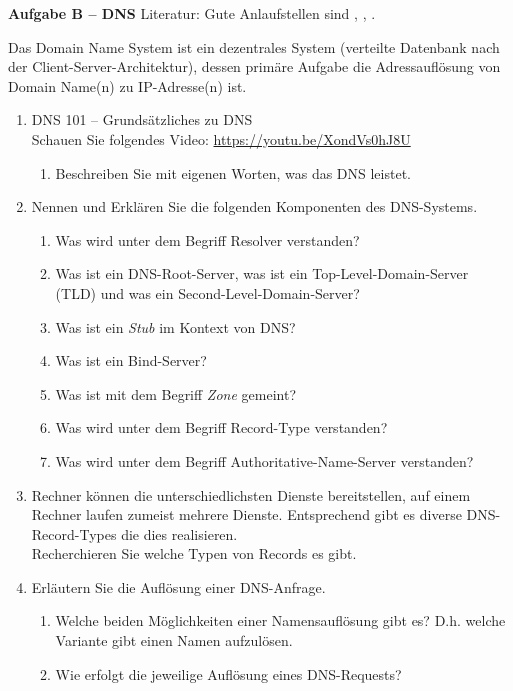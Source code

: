 \documentclass[paper=a4,fontsize=11pt]{scrartcl}%
\numberwithin{equation}{section}
\begin{document}
\begin{center}
\Large{\textbf{Aufgabe B -- DNS}}
Literatur:  Gute Anlaufstellen sind \cite[Kap. 2.5, S. 130ff]{Kurose2012}, \cite[Kap. 11, S. 511ff]{fall2011tcp}, \cite[Kap. 50, S. 825ff]{kozierok2005tcp}.
\end{center}
Das Domain Name System ist ein dezentrales System (verteilte Datenbank nach der Client-Server-Architektur), dessen primäre Aufgabe die Adressauflösung von Domain Name(n) zu IP-Adresse(n) ist.
\begin{enumerate}
	\item DNS 101 -- Grundsätzliches zu DNS\\
	Schauen Sie folgendes Video: \url{https://youtu.be/XondVs0hJ8U}
	\begin{enumerate}
		\item Beschreiben Sie mit eigenen Worten, was das DNS leistet.
	\end{enumerate}
	\item Nennen und Erklären Sie die folgenden Komponenten des DNS-Systems.
	\begin{enumerate}
		\item Was wird unter dem Begriff Resolver verstanden?
		\item Was ist ein DNS-Root-Server, was ist ein Top-Level-Domain-Server (TLD) und was ein Second-Level-Domain-Server?
		\item Was ist ein \emph{Stub} im Kontext von DNS?
		\item Was ist ein Bind-Server?
		\item Was ist mit dem Begriff \emph{Zone} gemeint?
		\item Was wird unter dem Begriff Record-Type verstanden?
		\item Was wird unter dem Begriff Authoritative-Name-Server verstanden?
	\end{enumerate}
	\item Rechner können die unterschiedlichsten Dienste bereitstellen, auf einem Rechner laufen zumeist mehrere Dienste. Entsprechend gibt es diverse DNS-Record-Types die dies realisieren.\\
	Recherchieren Sie welche Typen von Records es gibt.
	\item Erläutern Sie die Auflösung einer DNS-Anfrage.
	\begin{enumerate}
		\item Welche beiden Möglichkeiten einer Namensauflösung gibt es? D.h. welche Variante gibt einen Namen aufzulösen.
		\item Wie erfolgt die jeweilige Auflösung eines DNS-Requests?

\end{enumerate}
\end{enumerate}
\end{document}
